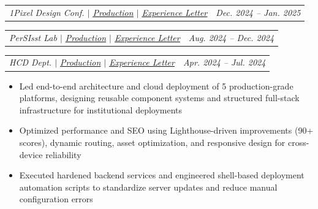 \documentclass[letterpaper,11pt]{article}
\makeatletter
\newcommand{\resumeItem}[1]{
  \item\small{
    {#1 \vspace{-2pt}}
  }
}
\newcommand{\resumeSubheading}[4]{
  \vspace{-2pt}\item
    \begin{tabular*}{0.97\textwidth}[t]{l@{\extracolsep{\fill}}r}
      \textbf{#1} & #2 \\
      \textit{\small#3} & \textit{\small #4} \\
    \end{tabular*}\vspace{-7pt}
}
\newcommand{\resumeSubSubheading}[2]{
    \item
    \begin{tabular*}{0.97\textwidth}{l@{\extracolsep{\fill}}r}
      \textit{\small#1} & \textit{\small #2} \\
    \end{tabular*}\vspace{-7pt}
}
\newcommand{\resumeItemListStart}{\begin{itemize}}
\newcommand{\resumeItemListEnd}{\end{itemize}\vspace{-5pt}}
\makeatother
\begin{document}
    \resumeSubSubheading
    {1Pixel Design Conf. $|$ \href{https://1pxdesignconf.iiitd.edu.in/}{\underline{Production}} $|$ \href{https://drive.google.com/file/d/1ZBmdpn35tOQ6O-hA4DlZQFGS6P-6t2TZ/view}{\underline{Experience Letter}}}{Dec. 2024 -- Jan. 2025}

    \resumeSubSubheading
    {PerSIsst Lab $|$ \href{https://persisst.iiitd.edu.in/}{\underline{Production}} $|$ \href{https://drive.google.com/file/d/1uVUchMiUUwhLph9rYhSjSyHx-VntRaQw/view}{\underline{Experience Letter}}}{Aug. 2024 -- Dec. 2024}
    
    \resumeSubSubheading
    {HCD Dept. $|$ \href{https://hcd.iiitd.ac.in/}{\underline{Production}} $|$ \href{https://drive.google.com/file/d/1ZBmdpn35tOQ6O-hA4DlZQFGS6P-6t2TZ/view}{\underline{Experience Letter}}}{Apr. 2024 -- Jul. 2024}

    \resumeItemListStart

    \resumeItem{Led end-to-end architecture and cloud deployment of 5 production-grade platforms, designing reusable component systems and structured full-stack infrastructure for institutional deployments}

    \resumeItem{Optimized performance and SEO using Lighthouse-driven improvements (90+ scores), dynamic routing, asset optimization, and responsive design for cross-device reliability}

    \resumeItem{Executed hardened backend services and engineered shell-based deployment automation scripts to standardize server updates and reduce manual configuration errors}
    
  \resumeItemListEnd



\end{document}
